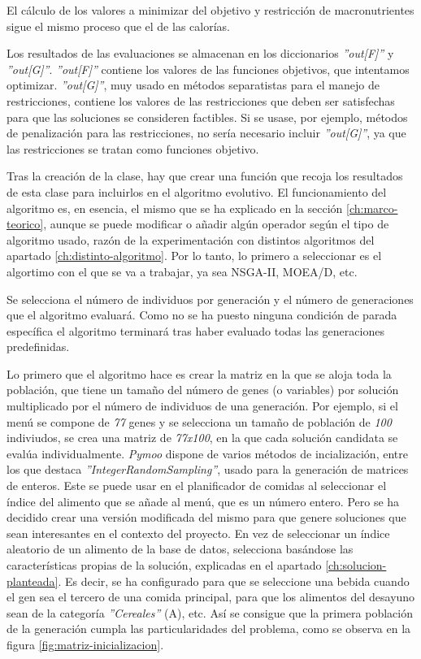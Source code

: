 El cálculo de los valores a minimizar del objetivo y restricción de macronutrientes sigue el mismo proceso que el de las calorías.

Los resultados de las evaluaciones se almacenan en los diccionarios \textit{''out[F]''} y \textit{''out[G]''}. \textit{''out[F]''} contiene los valores de las funciones objetivos, que intentamos optimizar. \textit{''out[G]''}, muy usado en métodos separatistas para el manejo de restricciones, contiene los valores de las restricciones que deben ser satisfechas para que las soluciones se consideren factibles. Si se usase, por ejemplo, métodos de penalización para las restricciones, no sería necesario incluir \textit{''out[G]''}, ya que las restricciones se tratan como funciones objetivo. 

Tras la creación de la clase, hay que crear una función que recoja los resultados de esta clase para incluirlos en el algoritmo evolutivo. El funcionamiento del algoritmo es, en esencia, el mismo que se ha explicado en la sección \ref{ch:marco-teorico}, aunque se puede modificar o añadir algún operador según el tipo de algoritmo usado, razón de la experimentación con distintos algoritmos del apartado \ref{ch:distinto-algoritmo}. Por lo tanto, lo primero a seleccionar es el algortimo con el que se va a trabajar, ya sea NSGA-II, MOEA/D, etc.

Se selecciona el número de individuos por generación y el número de generaciones que el algoritmo evaluará. Como no se ha puesto ninguna condición de parada específica el algoritmo terminará tras haber evaluado todas las generaciones predefinidas.

Lo primero que el algoritmo hace es crear la matriz en la que se aloja toda la población, que tiene un tamaño del número de genes (o variables) por solución multiplicado por el número de individuos de una generación. Por ejemplo, si el menú se compone de \textit{77} genes y se selecciona un tamaño de población de \textit{100} indiviudos, se crea una matriz de \textit{77x100}, en la que cada solución candidata se evalúa individualmente.
\newpage
\textit{Pymoo} dispone de varios métodos de incialización, entre los que destaca \textit{''IntegerRandomSampling''}, usado para la generación de matrices de enteros. Este se puede usar en el planificador de comidas al seleccionar el índice del alimento que se añade al menú, que es un número entero. Pero se ha decidido crear una versión modificada del mismo para que genere soluciones que sean interesantes en el contexto del proyecto. En vez de seleccionar un índice aleatorio de un alimento de la base de datos, selecciona basándose las características propias de la solución, explicadas en el apartado \ref{ch:solucion-planteada}. Es decir, se ha configurado para que se seleccione una bebida cuando el gen sea el tercero de una comida principal, para que los alimentos del desayuno sean de la categoría \textit{''Cereales''} (A), etc. Así se consigue que la primera población de la generación cumpla las particularidades del problema, como se observa en la figura \ref{fig:matriz-inicializacion}.

